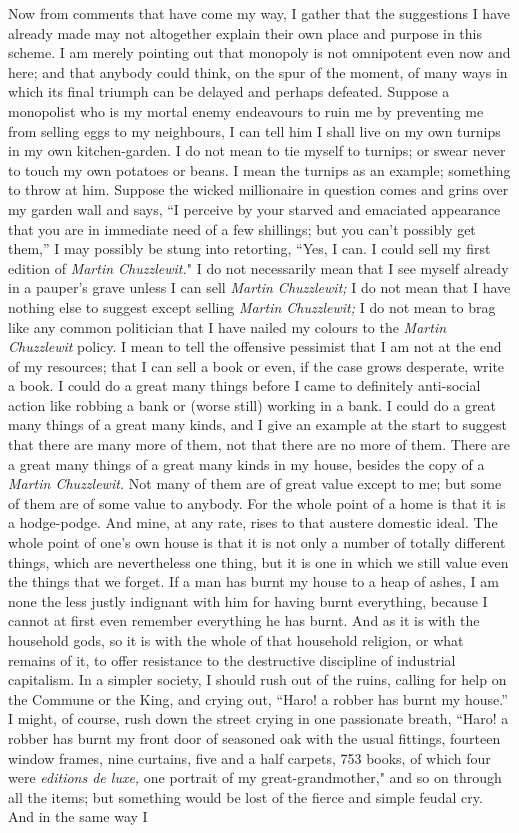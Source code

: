 \documentclass{book}
\begin{document}
Now from comments that have come my way, I gather that the suggestions I have already made may not altogether explain their own place and purpose in this scheme. I am merely pointing out that monopoly is not omnipotent even now and here; and that anybody could think, on the spur of the moment, of many ways in which its final triumph can be delayed and perhaps defeated. Suppose a monopolist who is my mortal enemy endeavours to ruin me by preventing me from selling eggs to my neighbours, I can tell him I shall live on my own turnips in my own kitchen-garden. I do not mean to tie myself to turnips; or swear never to touch my own potatoes or beans. I mean the turnips as an example; something to throw at him. Suppose the wicked millionaire in question comes and grins over my garden wall and says, “I perceive by your starved and emaciated appearance that you are in immediate need of a few shillings; but you can’t possibly get them,” I may possibly be stung into retorting, “Yes, I can. I could sell my first edition of \emph{Martin Chuzzlewit.}" I do not necessarily mean that I see myself already in a pauper’s grave unless I can sell \emph{Martin Chuzzlewit;} I do not mean that I have nothing else to suggest except selling \emph{Martin Chuzzlewit;} I do not mean to brag like any common politician that I have nailed my colours to the \emph{Martin Chuzzlewit} policy. I mean to tell the offensive pessimist that I am not at the end of my resources; that I can sell a book or even, if the case grows desperate, write a book. I could do a great many things before I came to definitely anti-social action like robbing a bank or (worse still) working in a bank. I could do a great many things of a great many kinds, and I give an example at the start to suggest that there are many more of them, not that there are no more of them. There are a great many things of a great many kinds in my house, besides the copy of a \emph{Martin Chuzzlewit.} Not many of them are of great value except to me; but some of them are of some value to anybody. For the whole point of a home is that it is a hodge-podge. And mine, at any rate, rises to that austere domestic ideal. The whole point of one’s own house is that it is not only a number of totally different things, which are nevertheless one thing, but it is one in which we still value even the things that we forget. If a man has burnt my house to a heap of ashes, I am none the less justly indignant with him for having burnt everything, because I cannot at first even remember everything he has burnt. And as it is with the household gods, so it is with the whole of that household religion, or what remains of it, to offer resistance to the destructive discipline of industrial capitalism. In a simpler society, I should rush out of the ruins, calling for help on the Commune or the King, and crying out, “Haro! a robber has burnt my house.” I might, of course, rush down the street crying in one passionate breath, “Haro! a robber has burnt my front door of seasoned oak with the usual fittings, fourteen window frames, nine curtains, five and a half carpets, 753 books, of which four were \emph{editions de luxe,} one portrait of my great-grandmother," and so on through all the items; but something would be lost of the fierce and simple feudal cry. And in the same way I 
\end{document}
